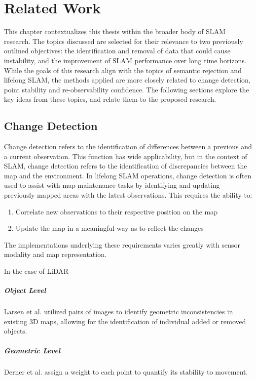 \section{Related Work}
\label{sec:related_work}

This chapter contextualizes this thesis within the broader body of SLAM research. The topics discussed are selected for their relevance to two previously outlined objectives: the identification and removal of data that could cause instability, and the improvement of SLAM performance over long time horizons. While the goals of this research align with the topics of semantic rejection and lifelong SLAM, the methods applied are more closely related to change detection, point stability and re-observability confidence. The following sections explore the key ideas from these topics, and relate them to the proposed research.

\subsection{Change Detection}

Change detection refers to the identification of differences between a previous and a current observation. This function has wide applicability, but in the context of SLAM, change detection refers to the identification of discrepancies between the map and the environment. In lifelong SLAM operations, change detection is often used to assist with map maintenance tasks by identifying and updating previously mapped areas with the latest observations. This requires the ability to:
\begin{enumerate}
    \item Correlate new observations to their respective position on the map
    \item Update the map in a meaningful way as to reflect the changes
\end{enumerate}
The implementations underlying these requirements varies greatly with sensor modality and map representation.

In the case of LiDAR 

\subparagraph{Object Level}
Larsen et al. \cite{larsenChangeDetectionModel} utilized pairs of images to identify geometric inconsistencies in existing 3D maps, allowing for the identification of individual added or removed objects.

\subparagraph{Geometric Level}
Derner et al. \cite{dernerChangeDetectionUsing2021} assign a weight to each point to quantify its stability to movement.




